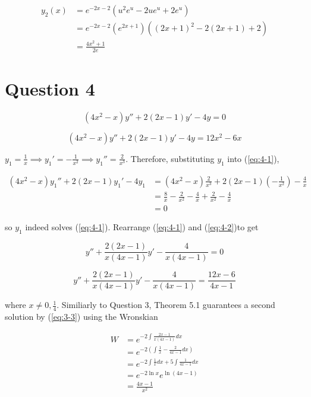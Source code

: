 \documentclass{article}
\begin{document}
\begin{align*}
    y_2(x) &= e^{-2x - 2}(u^2e^u - 2ue^u + 2e^u)\\
    &= e^{-2x - 2}(e^{2x + 1})((2x + 1)^2 - 2(2x + 1) + 2)\\
    &= \frac{4x^2 + 1}{2e}
\end{align*}

\section*{Question 4}

\begin{equation} \label{eq:4-1}
    (4x^2 - x)y'' + 2(2x - 1)y' - 4y = 0
\end{equation}

\hfill \break
\begin{equation} \label{eq:4-2}
    (4x^2 - x)y'' + 2(2x - 1)y' - 4y = 12x^2 - 6x
\end{equation}

$y_1 = \frac{1}{x} \implies y_1' = -\frac{1}{x^2} \implies y_1'' = \frac{2}{x^3}$. Therefore, substituting $y_1$ into (\ref{eq:4-1}),

\begin{align*}
    (4x^2 - x)y_1'' + 2(2x - 1)y_1' - 4y_1 &= (4x^2 - x)\frac{2}{x^3} + 2(2x - 1)\left(-\frac{1}{x^2}\right) - \frac{4}{x}\\
    &= \frac{8}{x} - \frac{2}{x^2} - \frac{4}{x} + \frac{2}{x^2} - \frac{4}{x}\\
    &= 0
\end{align*}

so $y_1$ indeed solves (\ref{eq:4-1}). Rearrange (\ref{eq:4-1}) and (\ref{eq:4-2})to get

\begin{equation} \label{eq:4-3}
    y'' + \frac{2(2x - 1)}{x(4x - 1)}y' - \frac{4}{x(4x - 1)} = 0
\end{equation}

\hfill \break
\begin{equation} \label{eq:4-4}
    y'' + \frac{2(2x - 1)}{x(4x - 1)}y' - \frac{4}{x(4x - 1)} = \frac{12x - 6}{4x - 1}
\end{equation}

where $x \neq 0, \frac{1}{4}$. Similiarly to Question 3, Theorem 5.1 guarantees a second solution by (\ref{eq:3-3}) using the Wronskian

\begin{align*}
    W &= e^{-2\int\frac{2x - 1}{x(4x - 1)} dx}\\
    &= e^{-2\left(\int \frac{1}{x} - \frac{2}{4x - 1}dx\right)}\\
    &= e^{-2\int \frac{1}{x} dx + 5\int \frac{1}{4x - 1} dx}\\
    &= e^{-2\ln x}e^{\ln(4x - 1)}\\
    &= \frac{4x - 1}{x^2}
\end{align*}
\end{document}
